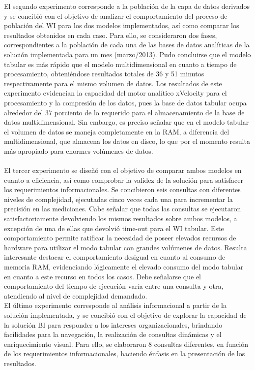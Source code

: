 \documentclass[preprint,12pt]{elsarticle}
\begin{document}
El segundo experimento corresponde a la población de la capa de datos derivados y se concibió con el objetivo  de  analizar  el  comportamiento  del  proceso  de  población  del  WI  para  los  dos  modelos implementados, así como comparar los resultados obtenidos en cada caso. Para ello, se consideraron dos fases,  correspondientes  a  la  población  de  cada  una  de  las  bases  de  datos  analíticas  de  la  solución implementada para  un mes  (marzo/2013). Pudo concluirse que el modelo  tabular es  más rápido que el modelo multidimensional en cuanto a tiempo de procesamiento, obteniéndose resultados totales de 36 y 51  minutos  respectivamente para  el  mismo  volumen  de  datos.  Los  resultados  de  este  experimento evidencian la capacidad del motor analítico xVelocity para el procesamiento y la compresión de los datos, pues la base de datos tabular ocupa alrededor del 37 porciento de lo requerido para el almacenamiento de la base de datos multidimensional. Sin embargo, es preciso señalar que en el modelo tabular el volumen de datos se maneja completamente en la RAM, a diferencia del multidimensional, que almacena los datos en disco, lo que por el momento resulta más apropiado para enormes volúmenes de datos. \\
\\
El tercer experimento se diseñó con el objetivo de comparar ambos modelos en cuanto a eficiencia, así como  comprobar  la  validez  de  la  solución  para  satisfacer  los  requerimientos  informacionales.  Se concibieron seis consultas con diferentes niveles de complejidad,  ejecutadas cinco veces cada una para incrementar  la  precisión  en  las  mediciones.  Cabe  señalar  que  todas  las  consultas  se  ejecutaron satisfactoriamente devolviendo los mismos resultados sobre ambos modelos, a excepción de una de ellas que devolvió time-out para el WI tabular. Este comportamiento permite ratificar la necesidad de poseer elevados recursos  de hardware para utilizar  el modo tabular con  grandes volúmenes de datos.  Resulta interesante destacar el comportamiento desigual en cuanto al consumo de  memoria RAM, evidenciando lógicamente el elevado consumo del modo tabular en cuanto a este recurso en todos los casos. Debe señalarse que el comportamiento del tiempo de ejecución varía entre una consulta y otra, atendiendo al nivel de complejidad demandado. \\
El último experimento corresponde al análisis informacional a partir de la solución implementada, y se concibió  con  el  objetivo  de  explorar  la  capacidad  de  la  solución  BI  para  responder  a  los  intereses organizacionales,  brindando facilidades  para la  navegación, la  realización de  consultas dinámicas y el enriquecimiento visual. Para ello, se elaboraron 8 consultas diferentes, en función de los requerimientos informacionales,  haciendo  énfasis  en  la  presentación  de  los  resultados.  \\
\end{document}
